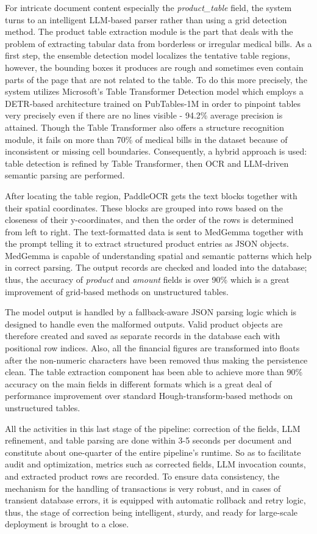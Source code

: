 \documentclass[conference,twocolumn]{IEEEtran}
\begin{document}
For intricate document content especially the \textit{product\_table}
field, the system turns to an intelligent LLM-based parser rather than
using a grid detection method.
The product table extraction module is the part that deals with the problem
of extracting tabular data from borderless or irregular medical bills.
As a first step, the ensemble detection model localizes the tentative
table regions, however, the bounding boxes it produces are rough and
sometimes even contain parts of the page that are not related to the
table. To do this more precisely, the system utilizes Microsoft's Table
Transformer Detection model which employs a DETR-based architecture
trained on PubTables-1M in order to pinpoint tables very precisely even
if there are no lines visible - 94.2\% average precision is attained.
Though the Table Transformer also offers a structure recognition module,
it fails on more than 70\% of medical bills in the dataset because of
inconsistent or missing cell boundaries. Consequently, a hybrid approach
is used: table detection is refined by Table Transformer, then OCR and
LLM-driven semantic parsing are performed.

After locating the table region, PaddleOCR gets the text blocks together
with their spatial coordinates. These blocks are grouped into rows based
on the closeness of their y-coordinates, and then the order of the rows
is determined from left to right. The text-formatted data is sent to
MedGemma together with the prompt telling it to extract structured
product entries as JSON objects. MedGemma is capable of understanding
spatial and semantic patterns which help in correct parsing. The output
records are checked and loaded into the database; thus, the accuracy of
\textit{product} and \textit{amount} fields is over 90\% which is a great
improvement of grid-based methods on unstructured
tables.

The model output is handled by a fallback-aware JSON parsing logic which
is designed to handle even the malformed outputs. Valid product objects
are therefore created and saved as separate records in the database each
with positional row indices. Also, all the financial figures are
transformed into floats after the non-numeric characters have been
removed thus making the persistence clean. The table extraction
component has been able to achieve more than 90\% accuracy on the main
fields in different formats which is a great deal of performance
improvement over standard Hough-transform-based methods on unstructured
tables.

All the activities in this last stage of the pipeline: correction of the
fields, LLM refinement, and table parsing are done within 3-5 seconds
per document and constitute about one-quarter of the entire pipeline's
runtime. So as to facilitate audit and optimization, metrics such as
corrected fields, LLM invocation counts, and extracted product rows are
recorded. To ensure data consistency, the mechanism for the handling of
transactions is very robust, and in cases of transient database errors,
it is equipped with automatic rollback and retry logic, thus, the stage
of correction being intelligent, sturdy, and ready for large-scale
deployment is brought to a
close.
\end{document}
